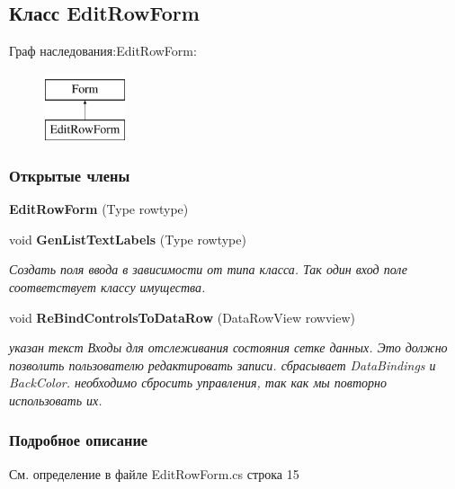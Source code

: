 \subsection{Класс Edit\+Row\+Form}
\label{classkdz__manager_1_1_edit_row_form}
Граф наследования\+:Edit\+Row\+Form\+:\begin{figure}[H]
\begin{center}
\leavevmode
\includegraphics[height=2.000000cm]{classkdz__manager_1_1_edit_row_form}
\end{center}
\end{figure}
\subsubsection*{Открытые члены}
\begin{DoxyCompactItemize}
\item 
{\bfseries Edit\+Row\+Form} (Type rowtype)\label{classkdz__manager_1_1_edit_row_form_a961ae1a89b9f867dba48c197f6ce0f48}

\item 
void {\bf Gen\+List\+Text\+Labels} (Type rowtype)
\begin{DoxyCompactList}\small\item\em Создать поля ввода в зависимости от типа класса. Так один вход поле соответствует классу имущества. \end{DoxyCompactList}\item 
void {\bf Re\+Bind\+Controls\+To\+Data\+Row} (Data\+Row\+View rowview)
\begin{DoxyCompactList}\small\item\em указан текст Входы для отслеживания состояния сетке данных. Это должно позволить пользователю редактировать записи. сбрасывает Data\+Bindings и Back\+Color. необходимо сбросить управления, так как мы повторно использовать их. \end{DoxyCompactList}\end{DoxyCompactItemize}


\subsubsection{Подробное описание}


См. определение в файле Edit\+Row\+Form.\+cs строка 15



